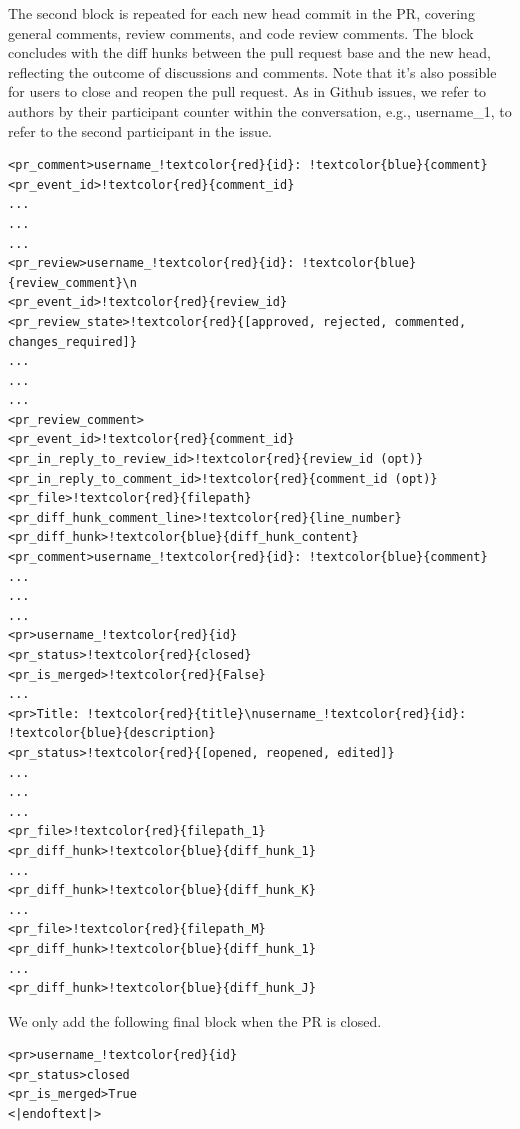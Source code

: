 \documentclass[10pt]{article} %
\begin{document}
The second block is repeated for each new head commit in the PR, covering general comments, review comments, and code review comments. The block concludes with the diff hunks between the pull request base and the new head, reflecting the outcome of discussions and comments. Note that it's also possible for users to close and reopen the pull request. As in Github issues, we refer to authors by their participant counter within the conversation, e.g., username\_1, to refer to the second participant in the issue. 

\begin{Verbatim}[commandchars=!\{\}]
<pr_comment>username_!textcolor{red}{id}: !textcolor{blue}{comment}
<pr_event_id>!textcolor{red}{comment_id}
...
...
...
<pr_review>username_!textcolor{red}{id}: !textcolor{blue}{review_comment}\n
<pr_event_id>!textcolor{red}{review_id}
<pr_review_state>!textcolor{red}{[approved, rejected, commented, changes_required]}
...
...
...
<pr_review_comment>
<pr_event_id>!textcolor{red}{comment_id}
<pr_in_reply_to_review_id>!textcolor{red}{review_id (opt)}
<pr_in_reply_to_comment_id>!textcolor{red}{comment_id (opt)}
<pr_file>!textcolor{red}{filepath}
<pr_diff_hunk_comment_line>!textcolor{red}{line_number}
<pr_diff_hunk>!textcolor{blue}{diff_hunk_content}
<pr_comment>username_!textcolor{red}{id}: !textcolor{blue}{comment}
...
...
...
<pr>username_!textcolor{red}{id}
<pr_status>!textcolor{red}{closed}
<pr_is_merged>!textcolor{red}{False}
...
<pr>Title: !textcolor{red}{title}\nusername_!textcolor{red}{id}: !textcolor{blue}{description}
<pr_status>!textcolor{red}{[opened, reopened, edited]}
...
...
...
<pr_file>!textcolor{red}{filepath_1}
<pr_diff_hunk>!textcolor{blue}{diff_hunk_1}
...
<pr_diff_hunk>!textcolor{blue}{diff_hunk_K}
...
<pr_file>!textcolor{red}{filepath_M}
<pr_diff_hunk>!textcolor{blue}{diff_hunk_1}
...
<pr_diff_hunk>!textcolor{blue}{diff_hunk_J}
\end{Verbatim}
We only add the following final block when the PR is closed. 
\begin{Verbatim}[commandchars=!\{\}]
<pr>username_!textcolor{red}{id}
<pr_status>closed
<pr_is_merged>True
<|endoftext|>
\end{Verbatim}
\end{document}
